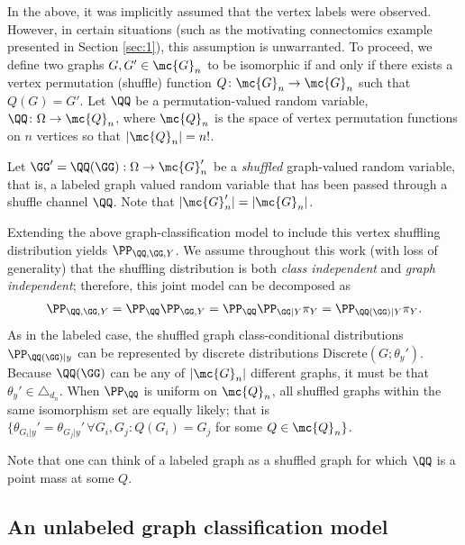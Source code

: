\documentclass[10pt,journal,cspaper,compsoc]{IEEEtran}
\newcommand{\Qs}{Q}
\begin{document}
In the above, it was implicitly assumed that the vertex labels were observed.  However, in certain situations (such as the motivating connectomics example presented in Section \ref{sec:1}), this assumption is unwarranted.  To proceed, we define two graphs $G,G' \in \mc{G}_n$ to be isomorphic if and only if there exists a vertex permutation (shuffle) function $\Qs\colon\mc{G}_n \to \mc{G}_n$ such that $\Qs(G)=G'$.  Let $\QQ$ be a permutation-valued random variable, $\QQ\colon\Omega \to \mc{Q}_n$, where $\mc{Q}_n$ is the space of vertex permutation functions on $n$ vertices so that $|\mc{Q}_n|=n!$.  
\begin{defi} \label{def:shuffled}
Let $\GG'=\QQ(\GG): \Omega \to \mc{G}_n'$ be a \emph{shuffled} graph-valued random variable, that is, a labeled graph valued random variable that has been passed through a shuffle channel $\QQ$. Note that $|\mc{G}_n'|=|\mc{G}_n|$. %
\end{defi}

Extending the above graph-classification model to include this vertex shuffling distribution yields $\PP_{\QQ,\GG,Y}$.  We assume throughout this work (with loss of generality) that the shuffling distribution is both \emph{class independent} and \emph{graph independent}; therefore, this joint model can be decomposed as
\begin{align}
	\PP_{\QQ,\GG,Y} = \PP_{\QQ} \PP_{\GG,Y} = \PP_{\QQ} \PP_{\GG |Y} \pi_Y = \PP_{\QQ(\GG) |Y} \pi_Y.
\end{align}
As in the labeled case, the shuffled graph class-conditional distributions $\PP_{\QQ(\GG)|y}$ can be represented by discrete distributions $\text{Discrete}(G; \theta_y')$.  Because $\QQ(\GG)$ can be any of $|\mc{G}_n|$ different graphs, it must be that $\theta_y' \in \triangle_{d_n}$.  When $\PP_{\QQ}$ is uniform on $\mc{Q}_n$, all shuffled graphs within the same isomorphism set are equally likely; that is  $\{\theta_{G_i|y}' = \theta_{G_j|y}' \, \forall G_i,G_j \colon \Qs(G_i)=G_j$ for some $\Qs \in \mc{Q}_n\}$.

Note that one can think of a labeled graph as a shuffled graph for which $\QQ$ is a point mass at some $Q$.


\subsection{An unlabeled graph classification model} %
\label{sub:an_unlabeled_graph_classification_model}
\end{document}
